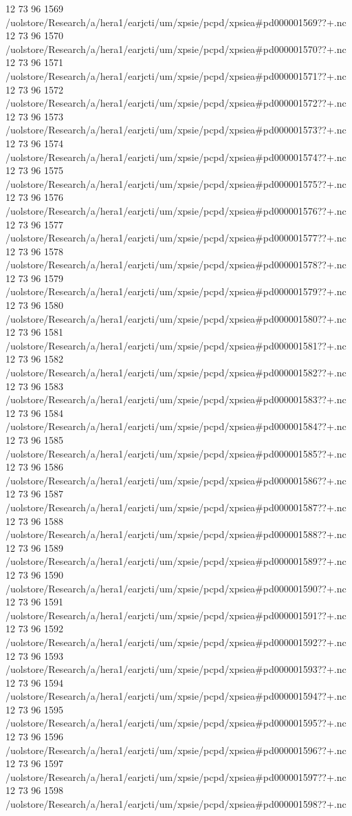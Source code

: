 12 73 96
1569
/uolstore/Research/a/hera1/earjcti/um/xpsie/pcpd/xpsiea#pd000001569??+.nc
12 73 96
1570
/uolstore/Research/a/hera1/earjcti/um/xpsie/pcpd/xpsiea#pd000001570??+.nc
12 73 96
1571
/uolstore/Research/a/hera1/earjcti/um/xpsie/pcpd/xpsiea#pd000001571??+.nc
12 73 96
1572
/uolstore/Research/a/hera1/earjcti/um/xpsie/pcpd/xpsiea#pd000001572??+.nc
12 73 96
1573
/uolstore/Research/a/hera1/earjcti/um/xpsie/pcpd/xpsiea#pd000001573??+.nc
12 73 96
1574
/uolstore/Research/a/hera1/earjcti/um/xpsie/pcpd/xpsiea#pd000001574??+.nc
12 73 96
1575
/uolstore/Research/a/hera1/earjcti/um/xpsie/pcpd/xpsiea#pd000001575??+.nc
12 73 96
1576
/uolstore/Research/a/hera1/earjcti/um/xpsie/pcpd/xpsiea#pd000001576??+.nc
12 73 96
1577
/uolstore/Research/a/hera1/earjcti/um/xpsie/pcpd/xpsiea#pd000001577??+.nc
12 73 96
1578
/uolstore/Research/a/hera1/earjcti/um/xpsie/pcpd/xpsiea#pd000001578??+.nc
12 73 96
1579
/uolstore/Research/a/hera1/earjcti/um/xpsie/pcpd/xpsiea#pd000001579??+.nc
12 73 96
1580
/uolstore/Research/a/hera1/earjcti/um/xpsie/pcpd/xpsiea#pd000001580??+.nc
12 73 96
1581
/uolstore/Research/a/hera1/earjcti/um/xpsie/pcpd/xpsiea#pd000001581??+.nc
12 73 96
1582
/uolstore/Research/a/hera1/earjcti/um/xpsie/pcpd/xpsiea#pd000001582??+.nc
12 73 96
1583
/uolstore/Research/a/hera1/earjcti/um/xpsie/pcpd/xpsiea#pd000001583??+.nc
12 73 96
1584
/uolstore/Research/a/hera1/earjcti/um/xpsie/pcpd/xpsiea#pd000001584??+.nc
12 73 96
1585
/uolstore/Research/a/hera1/earjcti/um/xpsie/pcpd/xpsiea#pd000001585??+.nc
12 73 96
1586
/uolstore/Research/a/hera1/earjcti/um/xpsie/pcpd/xpsiea#pd000001586??+.nc
12 73 96
1587
/uolstore/Research/a/hera1/earjcti/um/xpsie/pcpd/xpsiea#pd000001587??+.nc
12 73 96
1588
/uolstore/Research/a/hera1/earjcti/um/xpsie/pcpd/xpsiea#pd000001588??+.nc
12 73 96
1589
/uolstore/Research/a/hera1/earjcti/um/xpsie/pcpd/xpsiea#pd000001589??+.nc
12 73 96
1590
/uolstore/Research/a/hera1/earjcti/um/xpsie/pcpd/xpsiea#pd000001590??+.nc
12 73 96
1591
/uolstore/Research/a/hera1/earjcti/um/xpsie/pcpd/xpsiea#pd000001591??+.nc
12 73 96
1592
/uolstore/Research/a/hera1/earjcti/um/xpsie/pcpd/xpsiea#pd000001592??+.nc
12 73 96
1593
/uolstore/Research/a/hera1/earjcti/um/xpsie/pcpd/xpsiea#pd000001593??+.nc
12 73 96
1594
/uolstore/Research/a/hera1/earjcti/um/xpsie/pcpd/xpsiea#pd000001594??+.nc
12 73 96
1595
/uolstore/Research/a/hera1/earjcti/um/xpsie/pcpd/xpsiea#pd000001595??+.nc
12 73 96
1596
/uolstore/Research/a/hera1/earjcti/um/xpsie/pcpd/xpsiea#pd000001596??+.nc
12 73 96
1597
/uolstore/Research/a/hera1/earjcti/um/xpsie/pcpd/xpsiea#pd000001597??+.nc
12 73 96
1598
/uolstore/Research/a/hera1/earjcti/um/xpsie/pcpd/xpsiea#pd000001598??+.nc

